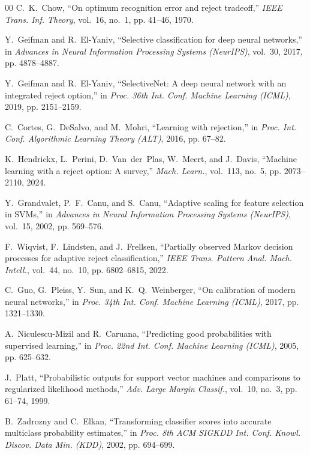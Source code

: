 \documentclass[conference]{IEEEtran}
\begin{document}
\begin{thebibliography}{00}
C.~K.~Chow, ``On optimum recognition error and reject tradeoff,'' \textit{IEEE Trans. Inf. Theory}, vol.~16, no.~1, pp. 41--46, 1970.

Y.~Geifman and R.~El-Yaniv, ``Selective classification for deep neural networks,'' in \textit{Advances in Neural Information Processing Systems (NeurIPS)}, vol.~30, 2017, pp. 4878--4887.

Y.~Geifman and R.~El-Yaniv, ``SelectiveNet: A deep neural network with an integrated reject option,'' in \textit{Proc. 36th Int. Conf. Machine Learning (ICML)}, 2019, pp. 2151--2159.

C.~Cortes, G.~DeSalvo, and M.~Mohri, ``Learning with rejection,'' in \textit{Proc. Int. Conf. Algorithmic Learning Theory (ALT)}, 2016, pp. 67--82.

K.~Hendrickx, L.~Perini, D.~Van~der~Plas, W.~Meert, and J.~Davis, ``Machine learning with a reject option: A survey,'' \textit{Mach. Learn.}, vol.~113, no.~5, pp. 2073--2110, 2024.

Y.~Grandvalet, P.~F.~Canu, and S.~Canu, ``Adaptive scaling for feature selection in SVMs,'' in \textit{Advances in Neural Information Processing Systems (NeurIPS)}, vol.~15, 2002, pp. 569--576.

F.~Wiqvist, F.~Lindsten, and J.~Frellsen, ``Partially observed Markov decision processes for adaptive reject classification,'' \textit{IEEE Trans. Pattern Anal. Mach. Intell.}, vol.~44, no.~10, pp. 6802--6815, 2022.

C.~Guo, G.~Pleiss, Y.~Sun, and K.~Q.~Weinberger, ``On calibration of modern neural networks,'' in \textit{Proc. 34th Int. Conf. Machine Learning (ICML)}, 2017, pp. 1321--1330.

A.~Niculescu-Mizil and R.~Caruana, ``Predicting good probabilities with supervised learning,'' in \textit{Proc. 22nd Int. Conf. Machine Learning (ICML)}, 2005, pp. 625--632.

J.~Platt, ``Probabilistic outputs for support vector machines and comparisons to regularized likelihood methods,'' \textit{Adv. Large Margin Classif.}, vol.~10, no.~3, pp. 61--74, 1999.

B.~Zadrozny and C.~Elkan, ``Transforming classifier scores into accurate multiclass probability estimates,'' in \textit{Proc. 8th ACM SIGKDD Int. Conf. Knowl. Discov. Data Min. (KDD)}, 2002, pp. 694--699.


\end{thebibliography}
\end{document}
